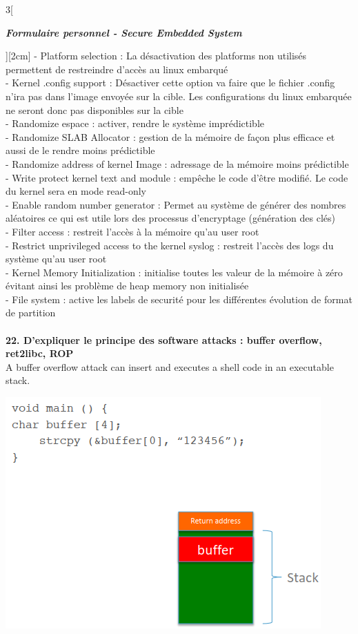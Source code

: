 \begin{multicols}{3}[\centerline{ \large\em \textbf{Formulaire personnel - Secure Embedded System}}][2cm]
- Platform selection : La désactivation des platforms non utilisés permettent de restreindre d'accès au linux embarqué\\
- Kernel .config support : Désactiver cette option va faire que le fichier .config n'ira pas dans l'image envoyée sur la cible. Les configurations du linux embarquée ne seront donc pas disponibles sur la cible\\
- Randomize espace :  activer, rendre le système imprédictible\\
- Randomize SLAB Allocator : gestion de la mémoire de façon plus efficace et aussi de le rendre moins prédictible\\
- Randomize address of kernel Image : adressage de la mémoire moins prédictible\\
- Write protect kernel text and module : empêche le code d'être modifié. Le code du kernel sera en mode read-only\\
- Enable random number generator : Permet au système de générer des nombres aléatoires ce qui est utile lors des processus d'encryptage (génération des clés)\\
- Filter access : restreit l'accès à la mémoire qu'au user root\\
- Restrict unprivileged access to the kernel syslog : restreit l'accès des logs du système qu'au user root\\
- Kernel Memory Initialization : initialise toutes les valeur de la mémoire à zéro évitant ainsi les problème de heap memory non initialisée\\
- File system : active les labels de securité pour les différentes évolution de format de partition\\
\\ \textbf{22. D’expliquer le principe des software attacks : buffer overflow, ret2libc, ROP\\}
A buffer overflow attack can insert and executes a shell code in an executable
stack.\\
\begin{minipage}{\linewidth}
	\centering
    \includegraphics[width =0.4\columnwidth]{images/8.png}

\end{minipage}
\end{multicols}
